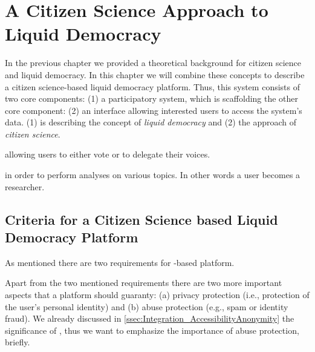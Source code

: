 \chapter{A Citizen Science Approach to Liquid Democracy}
\label{ch:Approach}

In the previous chapter we provided a theoretical background for citizen science and liquid democracy. In this chapter we will combine these concepts to describe a citizen science-based liquid democracy platform. Thus, this system consists of two core components: (1) a participatory system, which is scaffolding the other core component: (2) an interface allowing interested users to access the system’s data. (1) is describing the concept of \textit{liquid democracy} and (2) the approach of \textit{citizen science}.

allowing users to either vote or to delegate their voices.

 in order to perform analyses on various topics. In other words a user becomes a researcher.

\section{Criteria for a Citizen Science based Liquid Democracy Platform}
\label{sec:Criteria}

As mentioned there are two requirements for -based  platform. 

Apart from the two mentioned requirements there are two more important aspects that a  platform should guaranty: (a) privacy protection (i.e., protection of the user’s personal identity) and (b) abuse protection (e.g., spam or identity fraud). We already discussed in \autoref{ssec:Integration_AccessibilityAnonymity} the significance of , thus we want to emphasize the importance of abuse protection, briefly.

